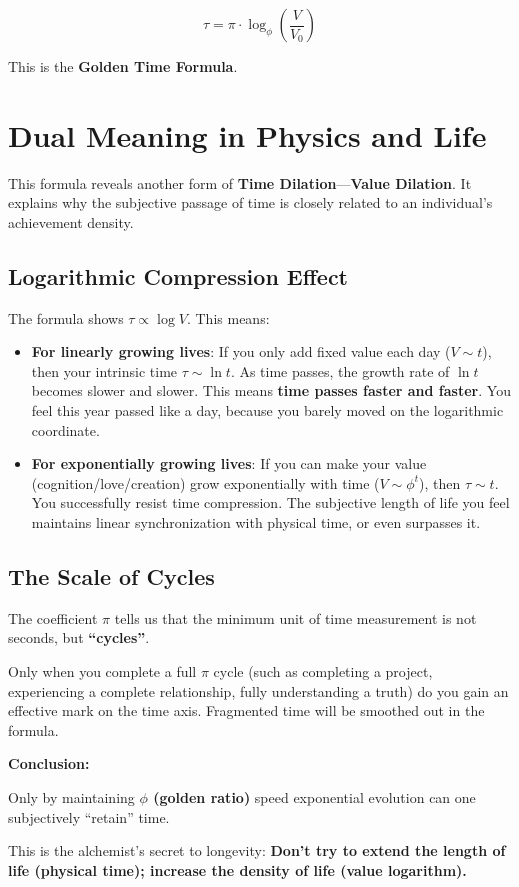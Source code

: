 \[\tau = \pi \cdot \log_{\phi} \left( \frac{V}{V_0} \right)\]

This is the \textbf{Golden Time Formula}.

\section{Dual Meaning in Physics and Life}

This formula reveals another form of \textbf{Time Dilation}---\textbf{Value Dilation}. It explains why the subjective passage of time is closely related to an individual's achievement density.

\subsection{Logarithmic Compression Effect}

The formula shows $\tau \propto \log V$. This means:

\begin{itemize}
\item \textbf{For linearly growing lives}: If you only add fixed value each day ($V \sim t$), then your intrinsic time $\tau \sim \ln t$. As time passes, the growth rate of $\ln t$ becomes slower and slower. This means \textbf{time passes faster and faster}. You feel this year passed like a day, because you barely moved on the logarithmic coordinate.

\item \textbf{For exponentially growing lives}: If you can make your value (cognition/love/creation) grow exponentially with time ($V \sim \phi^t$), then $\tau \sim t$. You successfully resist time compression. The subjective length of life you feel maintains linear synchronization with physical time, or even surpasses it.
\end{itemize}

\subsection{The Scale of Cycles}

The coefficient $\pi$ tells us that the minimum unit of time measurement is not seconds, but \textbf{``cycles''}.

Only when you complete a full $\pi$ cycle (such as completing a project, experiencing a complete relationship, fully understanding a truth) do you gain an effective mark on the time axis. Fragmented time will be smoothed out in the formula.

\textbf{Conclusion:}

Only by maintaining \textbf{$\phi$ (golden ratio)} speed exponential evolution can one subjectively ``retain'' time.

This is the alchemist's secret to longevity: \textbf{Don't try to extend the length of life (physical time); increase the density of life (value logarithm).}

